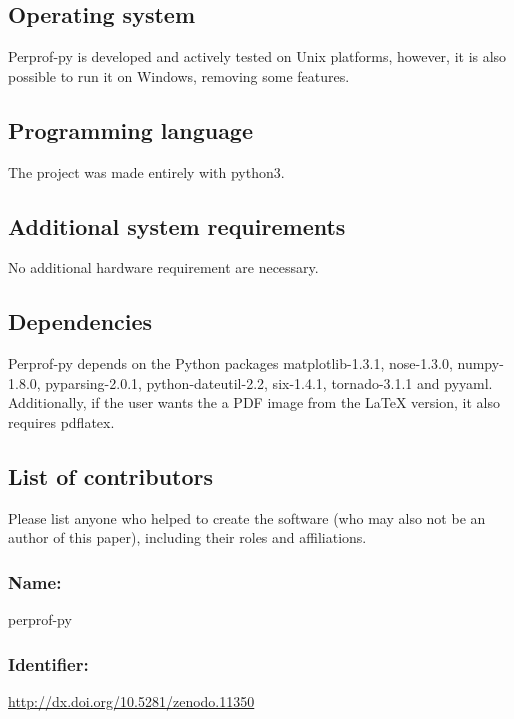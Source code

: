 \subsection*{Operating system}

    Perprof-py is developed and actively tested on Unix platforms, however, it
    is also possible to run it on Windows, removing some features.

\subsection*{Programming language}

    The project was made entirely with python3.

\subsection*{Additional system requirements}

    No additional hardware requirement are necessary.

\subsection*{Dependencies}

    Perprof-py depends on the Python packages matplotlib-1.3.1, nose-1.3.0,
    numpy-1.8.0, pyparsing-2.0.1, python-dateutil-2.2, six-1.4.1, tornado-3.1.1
    and pyyaml. Additionally, if the user wants the a PDF image from the LaTeX
    version, it also requires pdflatex.

\subsection*{List of contributors}

    Please list anyone who helped to create the software (who may also not be an
    author of this paper), including their roles and affiliations.

\Archive

    \subsubsection*{Name:} perprof-py

    \subsubsection*{Identifier:} \url{http://dx.doi.org/10.5281/zenodo.11350}

